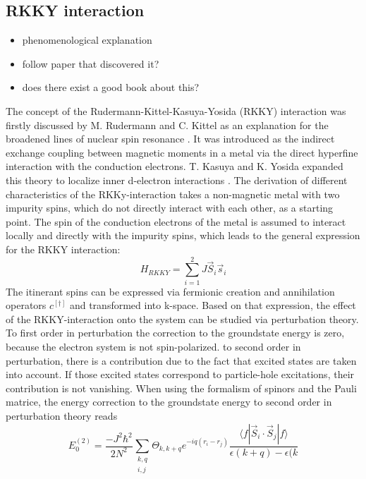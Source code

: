 \subsection{RKKY interaction} \label{sec:RKKY}
\begin{itemize}
    \item phenomenological explanation
    \item follow paper that discovered it?
    \item does there exist a good book about this?
\end{itemize}
The concept of the Rudermann-Kittel-Kasuya-Yosida (RKKY) interaction was firstly discussed by M. Rudermann and C. Kittel as an explanation for the broadened lines of nuclear spin resonance \cite{rudermann_ma_indirect_1954}. 
It was introduced as the indirect exchange coupling between magnetic moments in a metal via the direct hyperfine interaction with the conduction electrons.
T. Kasuya and K. Yosida expanded this theory to localize inner d-electron interactions \cite{yosida1957magnetic, kasuya1956theory}. \newline
The derivation of different characteristics of the RKKy-interaction takes a non-magnetic metal with two impurity spins, which do not directly interact with each other, as a starting point.
The spin of the conduction electrons of the metal is assumed to interact locally and directly with the impurity spins, which leads to the general expression for the RKKY interaction:
\begin{equation} \label{eq:RKKY_general}
    H_{RKKY} = \sum_{i=1}^2 J \Vec{S}_i \Vec{s}_i
\end{equation}
The itinerant spins can be expressed via fermionic creation and annihilation operators $c^{[\dag]}$ and transformed into k-space.
Based on that expression, the effect of the RKKY-interaction onto the system can be studied via perturbation theory. \newline
To first order in perturbation the correction to the groundstate energy is zero, because the electron system is not spin-polarized.
to second order in perturbation, there is a contribution due to the fact that excited states are taken into account. 
If those excited states correspond to particle-hole excitations, their contribution is not vanishing. 
When using the formalism of spinors and the Pauli matrice, the energy correction to the groundstate energy to second order in perturbation theory reads
\begin{equation}\nonumber
    E_0^{(2)} = \frac{-J^2\hbar^2}{2N^2} \sum_{\substack{k,q \\ i,j}} \Theta_{k,k+q} e^{-iq(r_i-r_j)} \frac{\langle f|\Vec{S}_i \cdot \Vec{S}_j|f\rangle}{\epsilon(k+q)- \epsilon(k}
\end{equation}
